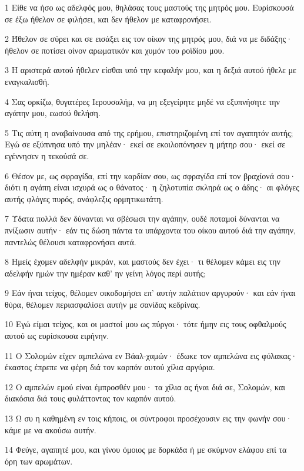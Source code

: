 \par 1 Είθε να ήσο ως αδελφός μου, θηλάσας τους μαστούς της μητρός μου. Ευρίσκουσά σε έξω ήθελον σε φιλήσει, και δεν ήθελον με καταφρονήσει.
\par 2 Ήθελον σε σύρει και σε εισάξει εις τον οίκον της μητρός μου, διά να με διδάξης· ήθελον σε ποτίσει οίνον αρωματικόν και χυμόν του ροϊδίου μου.
\par 3 Η αριστερά αυτού ήθελεν είσθαι υπό την κεφαλήν μου, και η δεξιά αυτού ήθελε με εναγκαλισθή.
\par 4 Σας ορκίζω, θυγατέρες Ιερουσαλήμ, να μη εξεγείρητε μηδέ να εξυπνήσητε την αγάπην μου, εωσού θελήση.
\par 5 Τις αύτη η αναβαίνουσα από της ερήμου, επιστηριζομένη επί τον αγαπητόν αυτής; Εγώ σε εξύπνησα υπό την μηλέαν· εκεί σε εκοιλοπόνησεν η μήτηρ σου· εκεί σε εγέννησεν η τεκούσά σε.
\par 6 Θέσον με, ως σφραγίδα, επί την καρδίαν σου, ως σφραγίδα επί τον βραχίονά σου· διότι η αγάπη είναι ισχυρά ως ο θάνατος· η ζηλοτυπία σκληρά ως ο άδης· αι φλόγες αυτής φλόγες πυρός, ανάφλεξις ορμητικωτάτη.
\par 7 Ύδατα πολλά δεν δύνανται να σβέσωσι την αγάπην, ουδέ ποταμοί δύνανται να πνίξωσιν αυτήν· εάν τις δώση πάντα τα υπάρχοντα του οίκου αυτού διά την αγάπην, παντελώς θέλουσι καταφρονήσει αυτά.
\par 8 Ημείς έχομεν αδελφήν μικράν, και μαστούς δεν έχει· τι θέλομεν κάμει εις την αδελφήν ημών την ημέραν καθ' ην γείνη λόγος περί αυτής;
\par 9 Εάν ήναι τείχος, θέλομεν οικοδομήσει επ' αυτήν παλάτιον αργυρούν· και εάν ήναι θύρα, θέλομεν περιασφαλίσει αυτήν με σανίδας κεδρίνας.
\par 10 Εγώ είμαι τείχος, και οι μαστοί μου ως πύργοι· τότε ήμην εις τους οφθαλμούς αυτού ως ευρίσκουσα ειρήνην.
\par 11 Ο Σολομών είχεν αμπελώνα εν Βάαλ-χαμών· έδωκε τον αμπελώνα εις φύλακας· έκαστος έπρεπε να φέρη διά τον καρπόν αυτού χίλια αργύρια.
\par 12 Ο αμπελών εμού είναι έμπροσθέν μου· τα χίλια ας ήναι διά σε, Σολομών, και διακόσια διά τους φυλάττοντας τον καρπόν αυτού.
\par 13 Ω συ η καθημένη εν τοις κήποις, οι σύντροφοι προσέχουσιν εις την φωνήν σου· κάμε με να ακούσω αυτήν.
\par 14 Φεύγε, αγαπητέ μου, και γίνου όμοιος με δορκάδα ή με σκύμνον ελάφου επί τα όρη των αρωμάτων.


